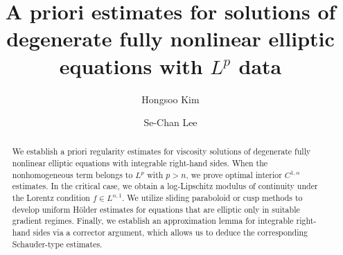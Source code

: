 \documentclass[11pt]{amsart}
\title[]{A priori estimates for solutions of degenerate fully nonlinear elliptic equations with $L^p$ data}
\author{Hongsoo Kim}
\author{Se-Chan Lee}
\theoremstyle{plain}
\theoremstyle{definition}
\numberwithin{equation}{section}
\begin{document}
\begin{abstract}
We establish a priori regularity estimates for viscosity solutions of degenerate fully nonlinear elliptic equations with integrable right-hand sides. When the nonhomogeneous term belongs to $L^p$ with $p>n$, we prove optimal interior $C^{1,\alpha}$ estimates. In the critical case, we obtain a log-Lipschitz modulus of continuity under the Lorentz condition $f\in L^{n,1}$. We utilize sliding paraboloid or cusp methods to develop uniform H\"older estimates for equations that are elliptic only in suitable gradient regimes. Finally, we establish an approximation lemma for integrable right-hand sides via a corrector argument, which allows us to deduce the corresponding Schauder-type estimates.
\end{abstract}

\maketitle

%	
% 
\end{document}
